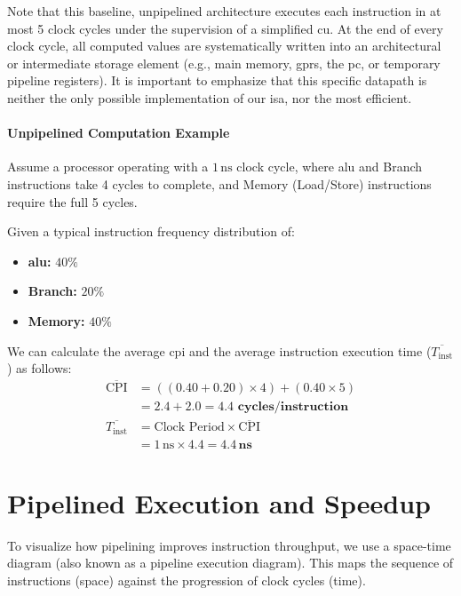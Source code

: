 \noindent Note that this baseline, unpipelined architecture executes each instruction in at most 5 clock cycles under the supervision of a simplified \gls{cu}. At the end of every clock cycle, all computed values are systematically written into an architectural or intermediate storage element (e.g., main memory, \glspl{gpr}, the \gls{pc}, or temporary pipeline registers). It is important to emphasize that this specific datapath is neither the only possible implementation of our \gls{isa}, nor the most efficient.

\paragraph{Unpipelined  Computation Example} 
Assume a processor operating with a \(1\,\text{ns}\) clock cycle, where \gls{alu} and Branch instructions take 4 cycles to complete, and Memory (Load/Store) instructions require the full 5 cycles. 

Given a typical instruction frequency distribution of:
\begin{itemize}
    \item \textbf{\gls{alu}:} $40\%$
    \item \textbf{Branch:} $20\%$
    \item \textbf{Memory:} $40\%$
\end{itemize}

\noindent We can calculate the average \gls{cpi} and the average instruction execution time (\(\overline{T_{\text{inst}}}\)) as follows:
\begin{align*}
    \overline{\text{CPI}} &= \left( (0.40 + 0.20) \times 4 \right) + (0.40 \times 5) \\
                          &= 2.4 + 2.0 = \mathbf{4.4 \text{ cycles/instruction}} \\[1em]
    \overline{T_{\text{inst}}} &= \text{Clock Period} \times \overline{\text{CPI}} \\
                               &= 1\,\text{ns} \times 4.4 = \mathbf{4.4\,\text{ns}}
\end{align*}

\section{Pipelined Execution and Speedup}
To visualize how pipelining improves instruction throughput, we use a space-time diagram (also known as a pipeline execution diagram). This maps the sequence of instructions (space) against the progression of clock cycles (time). 

